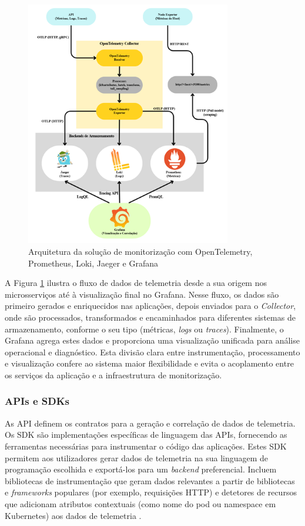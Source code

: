 \begin{figure}[H]
    \centering
    \includegraphics[width=0.80\textwidth]{images/Diagramas/arquitetura_da_solucao.png}
    \caption{Arquitetura da solução de monitorização com OpenTelemetry, Prometheus, Loki, Jaeger e Grafana}
    \label{fig:otel_arch}
\end{figure}

\clearpage

A Figura \ref{fig:otel_arch} ilustra o fluxo de dados de telemetria desde a sua origem nos microsserviços até à visualização final no Grafana. Nesse fluxo, os dados são primeiro gerados e enriquecidos nas aplicações, depois enviados para o \textit{Collector}, onde são processados, transformados e encaminhados para diferentes sistemas de armazenamento, conforme o seu tipo (métricas, \textit{logs} ou \textit{traces}). Finalmente, o Grafana agrega estes dados e proporciona uma visualização unificada para análise operacional e diagnóstico. Esta divisão clara entre instrumentação, processamento e visualização confere ao sistema maior flexibilidade e evita o acoplamento entre os serviços da aplicação e a infraestrutura de monitorização.

\subsubsection{APIs e SDKs}
As API definem os contratos para a geração e correlação de dados de telemetria. Os SDK são implementações específicas de linguagem das APIs, fornecendo as ferramentas necessárias para instrumentar o código das aplicações. Estes SDK permitem aos utilizadores gerar dados de telemetria na sua linguagem de programação escolhida e exportá-los para um \textit{backend} preferencial. Incluem bibliotecas de instrumentação que geram dados relevantes a partir de bibliotecas e \textit{frameworks} populares (por exemplo, requisições HTTP) e detetores de recursos que adicionam atributos contextuais (como nome do pod ou namespace em Kubernetes) aos dados de telemetria \cite{opentelemetry_docs,Thakur2022}.

